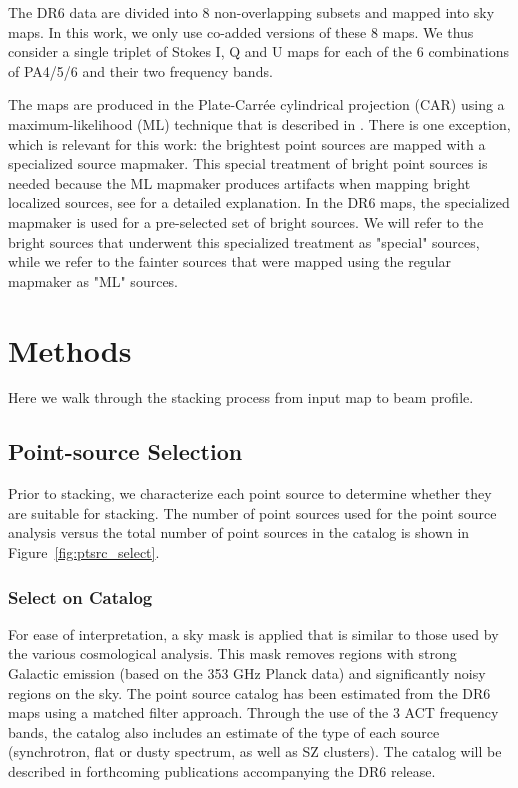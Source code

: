 The DR6 data are divided into 8 non-overlapping subsets and mapped into sky maps. In this work, we only use co-added versions of these 8 maps. We thus consider a single triplet of Stokes I, Q and U maps for each of the 6 combinations of PA4/5/6 and their two frequency bands. 

The maps are produced in the Plate-Carr\'{e}e cylindrical projection (CAR) using a maximum-likelihood (ML) technique that is described in \cite{aiola_2020}. There is one exception, which is relevant for this work: the brightest point sources are mapped with a specialized source mapmaker. This special treatment of bright point sources is needed because the ML mapmaker produces artifacts when mapping bright localized sources, see \cite{naess_2019} for a detailed explanation. In the DR6 maps, the specialized mapmaker is used for a pre-selected set of bright sources. We will refer to the bright sources that underwent this specialized treatment as "special" sources, while we refer to the fainter sources that were mapped using the regular mapmaker as "ML" sources.

\section{Methods}
\label{sec:stack}
Here we walk through the stacking process from input map to beam profile.  
\subsection{Point-source Selection}
\label{subsec:ptsrc_sel}
Prior to stacking, we characterize each point source to determine whether they are suitable for stacking.  The number of point sources used for the point source analysis versus the total number of point sources in the catalog is shown in Figure~\ref{fig:ptsrc_select}.

\subsubsection{Select on Catalog}
\label{subsubsec:cat_sel}
For ease of interpretation, a sky mask is applied that is similar to those used by the various cosmological analysis. This mask removes regions with strong Galactic emission (based on the 353 GHz Planck data) and significantly noisy regions on the sky.  The point source catalog has been estimated from the DR6 maps using a matched filter approach. Through the use of the 3 ACT frequency bands, the catalog also includes an estimate of the type of each source (synchrotron, flat or dusty spectrum, as well as SZ clusters). The catalog will be described in forthcoming publications accompanying the DR6 release.

